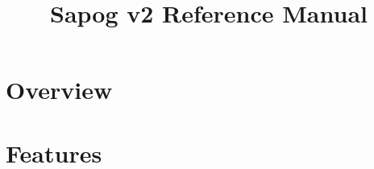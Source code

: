 \documentclass{zubaxdoc}
\title{Sapog v2 Reference Manual}
\begin{document}
\frontmatter

\begin{titlepage}
\section*{Overview}
\section*{Features}
\BeginRightColumn
\end{titlepage}

\tableofcontents
\listoffigures
\listoftables

\mainmatter
\end{document}
